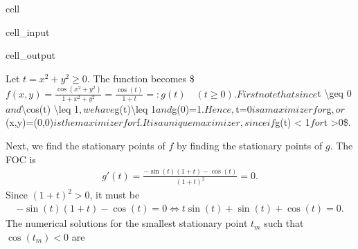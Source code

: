 \documentclass[letterpaper,10pt,english]{jupyterBook}
\begin{document}
\begin{sphinxuseclass}{cell}
\begin{sphinxVerbatimInput}
\begin{sphinxuseclass}{cell_input}
\end{sphinxuseclass}\end{sphinxVerbatimInput}
\begin{sphinxVerbatimOutput}

\begin{sphinxuseclass}{cell_output}
\noindent{}

\end{sphinxuseclass}\end{sphinxVerbatimOutput}

\end{sphinxuseclass}
\sphinxAtStartPar
Let \(t = x^2+y^2 \geq 0\).
The function becomes \$\(f(x,y) = \frac{\cos(x^2+y^2)}{1 + x^2+y^2} = \frac{\cos(t)}{1 + t} =: g(t)  \quad (t \geq 0) .\)\(
First note that since \)t \textbackslash{}geq 0\( and \)\textbackslash{}cos(t) \textbackslash{}leq 1\(, we have \)g(t)\textbackslash{}leq 1\( and \)g(0)=1\(.
Hence, \)t=0\( is a maximizer for \)g\(, or \)(x,y)=(0,0)\( is the maximizer for \)f\(.
It is a unique maximizer, since if \)g(t) < 1\( for \)t >0\$.

\sphinxAtStartPar
Next, we find the stationary points of \(f\) by finding the stationary points of \(g\).
The FOC is
\begin{equation*}
\begin{split}g'(t) = \frac{-\sin(t)(1+t) - \cos(t)}{(1+t)^2} = 0.\end{split}
\end{equation*}
\sphinxAtStartPar
Since \((1+t)^2>0\), it must be
\begin{equation*}
\begin{split}-\sin(t)(1+t) - \cos(t) = 0 ⇔ t\sin(t) + \sin(t) + \cos(t)=0.\end{split}
\end{equation*}
\sphinxAtStartPar
The numerical solutions for the smallest stationary point \(t_m\) such that \(\cos(t_m)<0\) are
\end{document}
